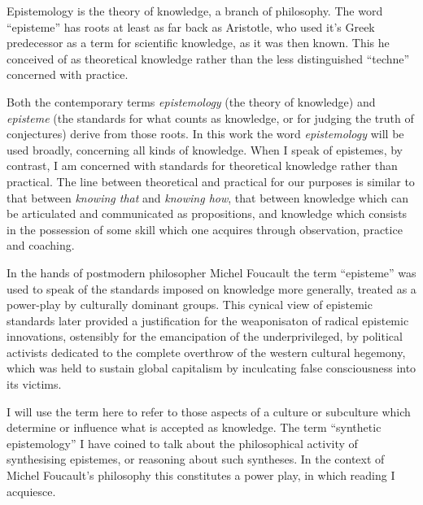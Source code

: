 \documentclass[10pt,titlepage]{article}
\begin{document}
Epistemology is the theory of knowledge, a branch of philosophy.
The word ``episteme'' has roots at least as far back as Aristotle, who used it's Greek predecessor as a term for scientific knowledge, as it was then known.
This he conceived of as theoretical knowledge rather than the less distinguished ``techne'' concerned with practice.

Both the contemporary terms \emph{epistemology} (the theory of knowledge) and \emph{episteme} (the standards for what counts as knowledge, or for judging the truth of conjectures) derive from those roots.
In this work the word \emph{epistemology} will be used broadly, concerning all kinds of knowledge.
When I speak of epistemes, by contrast, I am concerned with standards for theoretical knowledge rather than practical.
The line between theoretical and practical for our purposes is similar to that between \emph{knowing that} and \emph{knowing how}, that between knowledge which can be articulated and communicated as propositions, and knowledge which consists in the possession of some skill which one acquires through observation, practice and coaching.

In the hands of postmodern philosopher Michel Foucault the term ``episteme'' was used to speak of the standards imposed on knowledge more generally, treated as a power-play by culturally dominant groups.
This cynical view of epistemic standards later provided a justification for the weaponisaton of radical epistemic innovations, ostensibly for the emancipation of the underprivileged, by political activists dedicated to the complete overthrow of the western cultural hegemony, which was held to sustain global capitalism by inculcating false consciousness into its victims.

I will use the term here to refer to those aspects of a culture or subculture which determine or influence what is accepted as knowledge.
The term ``synthetic epistemology'' I have coined to talk about the philosophical activity of synthesising epistemes, or reasoning about such syntheses.
In the context of Michel Foucault's philosophy this constitutes a power play, in which reading I acquiesce.
\end{document}
